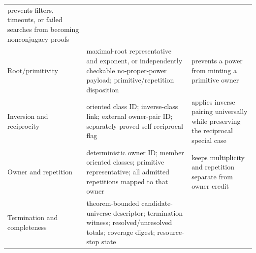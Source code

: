 \documentclass[11pt,a4paper]{article}
\begin{document}
\begin{longtable}[]{@{}lll@{}}
\begin{minipage}[t]{0.30\columnwidth}
prevents filters, timeouts, or failed searches from becoming nonconjugacy proofs\strut
\end{minipage}\tabularnewline
\begin{minipage}[t]{0.30\columnwidth}\raggedright
Root/primitivity\strut
\end{minipage} & \begin{minipage}[t]{0.30\columnwidth}\raggedright
maximal-root representative and exponent, or independently checkable no-proper-power payload; primitive/repetition disposition\strut
\end{minipage} & \begin{minipage}[t]{0.30\columnwidth}\raggedright
prevents a power from minting a primitive owner\strut
\end{minipage}\tabularnewline
\begin{minipage}[t]{0.30\columnwidth}\raggedright
Inversion and reciprocity\strut
\end{minipage} & \begin{minipage}[t]{0.30\columnwidth}\raggedright
oriented class ID; inverse-class link; external owner-pair ID; separately proved self-reciprocal flag\strut
\end{minipage} & \begin{minipage}[t]{0.30\columnwidth}\raggedright
applies inverse pairing universally while preserving the reciprocal special case\strut
\end{minipage}\tabularnewline
\begin{minipage}[t]{0.30\columnwidth}\raggedright
Owner and repetition\strut
\end{minipage} & \begin{minipage}[t]{0.30\columnwidth}\raggedright
deterministic owner ID; member oriented classes; primitive representative; all admitted repetitions mapped to that owner\strut
\end{minipage} & \begin{minipage}[t]{0.30\columnwidth}\raggedright
keeps multiplicity and repetition separate from owner credit\strut
\end{minipage}\tabularnewline
\begin{minipage}[t]{0.30\columnwidth}\raggedright
Termination and completeness\strut
\end{minipage} & \begin{minipage}[t]{0.30\columnwidth}\raggedright
theorem-bounded candidate-universe descriptor; termination witness; resolved/unresolved totals; coverage digest; resource-stop state\strut
\end{minipage} & \begin{minipage}[t]{0.30\columnwidth}\raggedright

\end{minipage}
\end{longtable}
\end{document}
